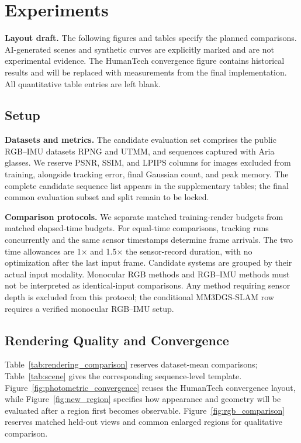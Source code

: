 \section{Experiments}
\label{sec:exp}

\noindent\textbf{Layout draft.}
The following figures and tables specify the planned comparisons.
AI-generated scenes and synthetic curves are explicitly marked and are not
experimental evidence. The HumanTech convergence figure contains historical
results and will be replaced with measurements from the final implementation.
All quantitative table entries are left blank.

\subsection{Setup}
\label{ssec:setup}

\noindent\textbf{Datasets and metrics.}
The candidate evaluation set comprises the public RGB--IMU datasets RPNG and
UTMM, and sequences captured with Aria glasses.
We reserve PSNR, SSIM, and LPIPS columns for images excluded from training,
alongside tracking error, final Gaussian count, and peak memory.
The complete candidate sequence list appears in the supplementary tables;
the final common evaluation subset and split remain to be locked.

\noindent\textbf{Comparison protocols.}
We separate matched training-render budgets from matched elapsed-time budgets.
For equal-time comparisons, tracking runs concurrently and the same sensor
timestamps determine frame arrivals. The two time allowances are
1$\times$ and 1.5$\times$ the sensor-record duration, with no optimization
after the last input frame.
Candidate systems are grouped by their actual input modality. Monocular
RGB methods and RGB--IMU methods must not be interpreted as identical-input
comparisons. Any method requiring sensor depth is excluded from this protocol;
the conditional MM3DGS-SLAM row requires a verified monocular RGB--IMU setup.

\subsection{Rendering Quality and Convergence}
\label{ssec:main}

Table~\ref{tab:rendering_comparison} reserves dataset-mean comparisons;
Table~\ref{tab:scene} gives the corresponding sequence-level template.
Figure~\ref{fig:photometric_convergence} reuses the HumanTech convergence
layout, while Figure~\ref{fig:new_region} specifies how appearance and geometry
will be evaluated after a region first becomes observable.
Figure~\ref{fig:rgb_comparison} reserves matched held-out views and common
enlarged regions for qualitative comparison.

